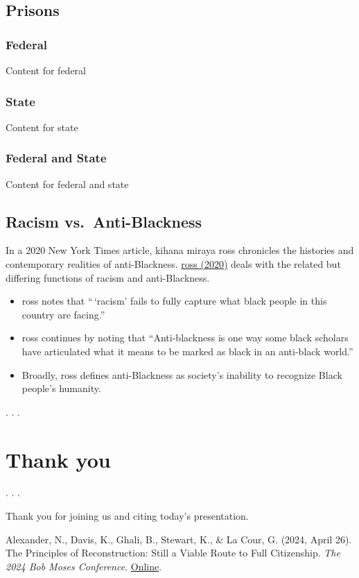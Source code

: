 \documentclass[
  letterpaper,
  DIV=11,
  numbers=noendperiod]{scrartcl}
\begin{document}
\hypertarget{prisons-2}{%
\subsection{Prisons}\label{prisons-2}}

\subsubsection{Federal}

Content for federal

\subsubsection{State}

Content for state

\subsubsection{Federal and State}

Content for federal and state

\hypertarget{racism-vs.-anti-blackness}{%
\subsection{Racism vs.~Anti-Blackness}\label{racism-vs.-anti-blackness}}

In a 2020 New York Times article, kihana miraya ross chronicles the
histories and contemporary realities of anti-Blackness.
\href{https://www.nytimes.com/2020/06/04/opinion/george-floyd-anti-blackness.html}{ross
(2020)} deals with the related but differing functions of racism and
anti-Blackness.

\begin{itemize}
\item
  ross notes that ``\,`racism' fails to fully capture what black people
  in this country are facing.''
\item
  ross continues by noting that ``Anti-blackness is one way some black
  scholars have articulated what it means to be marked as black in an
  anti-black world.''
\item
  Broadly, ross defines anti-Blackness as society's inability to
  recognize Black people's humanity.
\end{itemize}

. . .

\hypertarget{thank-you}{%
\section{Thank you}\label{thank-you}}

. . .

Thank you for joining us and citing today's presentation.

Alexander, N., Davis, K., Ghali, B., Stewart, K., \& La Cour, G. (2024,
April 26). The Principles of Reconstruction: Still a Viable Route to
Full Citizenship. \emph{The 2024 Bob Moses Conference}.
\href{https://www.bobmosesconference.com/}{Online}.
\end{document}
